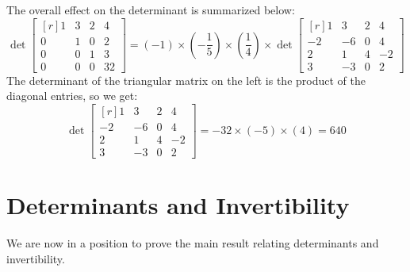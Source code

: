 \documentclass[12pt]{article}
\begin{document}
The overall effect on the determinant is summarized below:
\[
\det\left[\begin{matrix*}[r]1 & 3 & 2 & 4\\0 & 1 & 0 & 2\\0 & 0 & 1 & 3\\0 & 0 & 0 & 32\end{matrix*}\right]
=
(-1)\times\left(-\frac{1}{5}\right)\times\left(\frac{1}{4}\right)\times\det
\left[\begin{matrix*}[r]1 & 3 & 2 & 4\\-2 & -6 & 0 & 4\\2 & 1 & 4 & -2\\3 & -3 & 0 & 2\end{matrix*}\right]
\]
The determinant of the triangular matrix on the left is the product of the diagonal entries, so we get:
\[
\det
\left[\begin{matrix*}[r]1 & 3 & 2 & 4\\-2 & -6 & 0 & 4\\2 & 1 & 4 & -2\\3 & -3 & 0 & 2\end{matrix*}\right]=
-32\times(-5)\times(4)=640
\]

\section{Determinants and Invertibility}

We are now in a position to prove the main result relating determinants and invertibility.
\end{document}
